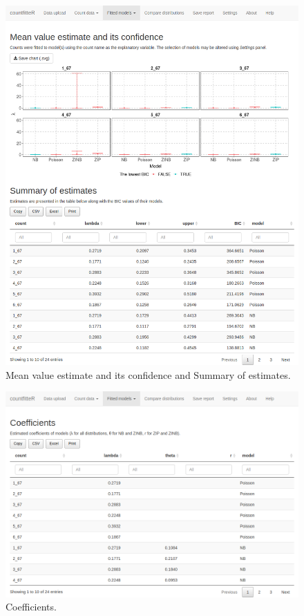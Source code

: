 \begin{figure}[htbp]
  \centering
  \includegraphics[width=0.99\columnwidth]{fig/cf_fm1.png}
  \caption{Mean value estimate and its confidence and Summary of estimates.}
    \label{cf_fm1}
\end{figure}

\begin{figure}[htbp]
  \centering
  \includegraphics[width=0.99\columnwidth]{fig/cf_fm2.png}
  \caption{Coefficients.}
    \label{cf_fm2}
\end{figure}

